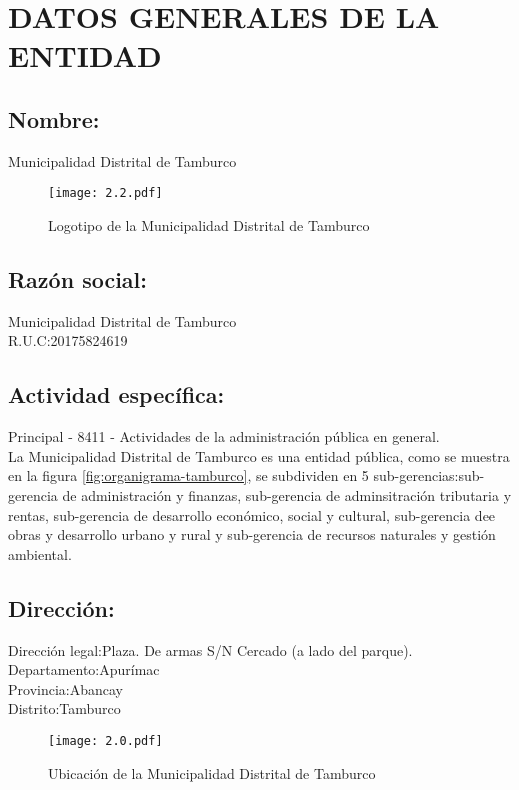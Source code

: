 \chapter{DATOS GENERALES DE LA ENTIDAD}
\section{Nombre:}
Municipalidad Distrital de Tamburco\\

\begin{figure}[h!]
	\captionsetup{width=0.4\textwidth}
	\centering
	\texttt{[image: 2.2.pdf]}
	\caption[Logotipo de la Municipalidad Distrital de Tamburco]{Logotipo de la Municipalidad Distrital de Tamburco}
	\label{fig:mdt-1}
\end{figure}

\section{Razón social:}
\noindent Municipalidad Distrital de Tamburco\\
R.U.C:20175824619

\section{Actividad específica:}
\noindent Principal - 8411 - Actividades de la administración pública en general.\\
La Municipalidad Distrital de Tamburco es una entidad pública, como se muestra en la figura \ref{fig:organigrama-tamburco}, se subdividen en 5 sub-gerencias:sub-gerencia de administración y finanzas, sub-gerencia de adminsitración tributaria y rentas, sub-gerencia de desarrollo económico, social y cultural, sub-gerencia dee obras y desarrollo urbano y rural y sub-gerencia de recursos naturales y gestión ambiental.
\section{Dirección:}
\noindent Dirección legal:Plaza. De armas S/N Cercado (a lado del parque).\\
Departamento:Apurímac\\
Provincia:Abancay\\
Distrito:Tamburco
\begin{figure}[h!]
	\captionsetup{width=0.8\textwidth}
	\centering
	\texttt{[image: 2.0.pdf]}\\
	\caption[Mapa de ubicación del Palacio Municipal]{Ubicación de la Municipalidad Distrital de Tamburco}
	\label{map_ubic}
\end{figure}
